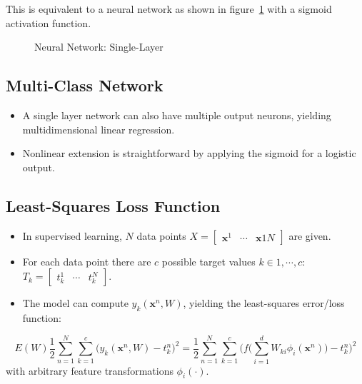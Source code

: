 \documentclass[a4paper, 11pt, accentcolor = tud3b]{tudreport}
\renewcommand{\vec}[1]{\mathbf{#1}}
\begin{document}
				This is equivalent to a neural network as shown in figure~\ref{fig:nnSingleLayer} with a sigmoid activation function.
				
				\begin{figure}
					\centering
					\caption{Neural Network: Single-Layer}
					\label{fig:nnSingleLayer}
				\end{figure}
			
			\subsection{Multi-Class Network}
				\begin{itemize}
					\item A single layer network can also have multiple output neurons, yielding multidimensional linear regression.
					\item Nonlinear extension is straightforward by applying the sigmoid for a logistic output.
				\end{itemize}

			\subsection{Least-Squares Loss Function}
				\begin{itemize}
					\item In supervised learning, \(N\) data points \( X = \begin{bmatrix} \vec{x}^1 & \cdots & \vec{x}1N \end{bmatrix} \) are given.
					\item For each data point there are \(c\) possible target values \( k \in 1, \cdots, c \): \( T_k = \begin{bmatrix} t_k^1 & \cdots & t_k^N \end{bmatrix} \).
					\item The model can compute \( y_k(\vec{x}^n, W) \), yielding the least-squares error/loss function:
				\end{itemize}
				\begin{equation}
					E(W) \frac{1}{2} \sum_{n = 1}^{N} \sum_{k = 1}^{c} \big( y_k(\vec{x}^n, W) - t_k^n \big)^2 = \frac{1}{2} \sum_{n = 1}^{N} \sum_{k = 1}^{c} \Bigg( f\Bigg( \sum_{i = 1}^{d} W_{ki} \phi_i(\vec{x}^n) \Bigg) - t_k^n \Bigg)^2
				\end{equation}
				with arbitrary feature transformations \( \phi_i(\cdot) \).
\end{document}
